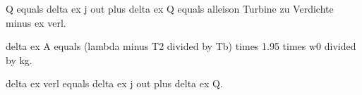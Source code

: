 Q equals delta ex j out plus delta ex Q equals alleison Turbine zu Verdichte minus ex verl.

delta ex A equals (lambda minus T2 divided by Tb) times 1.95 times w0 divided by kg.

delta ex verl equals delta ex j out plus delta ex Q.